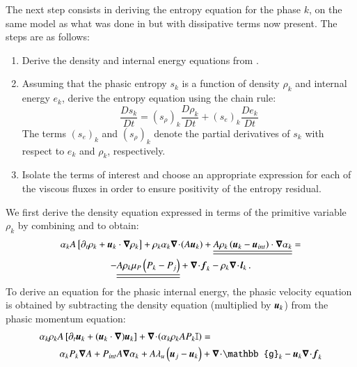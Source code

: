 \documentclass[preprint,10pt]{elsarticle}
\begin{document}
The next step consists in deriving the entropy equation for the phase $k$, on the same model as what was done in  but with dissipative terms now present. The steps are as follows:
%
\begin{enumerate}
\item Derive the density and internal energy equations from .
\item Assuming that the phasic entropy $s_k$ is a function of density $\rho_k$ and internal energy $e_k$, derive the entropy equation using the chain rule:
\begin{equation}
\label{eq:chain_rule-sct4}
\frac{Ds_k}{Dt} = \left( s_{\rho} \right)_k \frac{D \rho_k}{Dt} + \left( s_{e} \right)_k \frac{D e_k}{Dt} 
\end{equation}
The terms $(s_e)_k$ and $(s_{\rho})_k$ denote the partial derivatives of $s_k$ with respect to $e_k$ and $\rho_k$, respectively.
\item Isolate the terms of interest and choose an appropriate expression for each of the viscous fluxes in order to ensure positivity of the entropy residual.
\end{enumerate}
%
We first derive the density equation expressed in terms of the primitive variable $\rho_k$ by combining  and  to obtain:
%
\begin{multline}\label{eq:rho-7-eqn-model-sect4}
\alpha_k A \left[ \partial_t \rho_k + \boldsymbol u_k  \cdot \boldsymbol\nabla \rho_k \right] 
+ \rho_k \alpha_k \boldsymbol\nabla\! \cdot \! (A \boldsymbol u_k ) 
+  \underline{\underline{ A \rho_k \left( \boldsymbol u_k - \boldsymbol u_{int} \right) \cdot \boldsymbol\nabla \alpha_k}} = \\-\underline{\underline{A \rho_k \mu_P \left( P_k - P_j \right)}} + \boldsymbol\nabla\! \cdot \! \boldsymbol f_k - \rho_k \boldsymbol\nabla\! \cdot \! \boldsymbol l_k \,.
\end{multline}
%
To derive an equation for the phasic internal energy, the phasic velocity equation is obtained by subtracting the density equation (multiplied by $\boldsymbol u_k$) from the phasic momentum equation:
%
\begin{align}\label{eq:vel-7-eqn-model-sect4}
\alpha_k \rho_k  A \left[ \partial_t \mbold u_k + (\mbold u_k \cdot \grad) \mbold u_k \right]  + \div \left( \alpha_k \rho_k A P_k \mathbb{I} \right) &=\nonumber\\
\alpha_k P_k \grad A + P_{int} A \grad \alpha_k + A \lambda_u \left( \mbold u_j - \mbold u_k \right) &+ \div \mathbb{g}_k - \mbold u_k \div \mbold f_k
\end{align}
\end{document}
